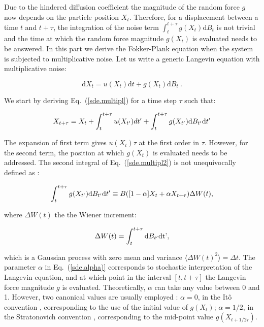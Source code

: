 Due to the hindered diffusion coefficient the magnitude of the random force $g$ now depends on the particle position $X_t$. Therefore, for a displacement between a time $t$ and $t+\tau$, the integration of the noise term $\int_t ^{t+\tau}g(X_t)\mathrm{d}B_t$ is not trivial and the time at which the random force magnitude $g(X_t)$ is evaluated needs to be answered. In this part we derive the Fokker-Plank equation when the system is subjected to multiplicative noise. Let us write a generic Langevin equation with multiplicative noise:

\begin{equation}
	\mathrm{d}X_t = u(X_t)\mathrm{d}t + g(X_t)\mathrm{d}B_t~.
	\label{sde.multipl}
\end{equation}

We start by deriving Eq.~(\ref{sde.multipl}) for a time step $\tau$ such that:

\begin{equation}
	X_{t+\tau} = X_t + \int_{t}^{t+\tau} u(X_{t'})dt' + \int_{t}^{t+\tau} g(X_{t'})\textnormal{d}B_{t'}\textnormal{d}t'
	\label{sde.multipl2}
\end{equation}

The expansion of first term gives $u(X_t)\tau$ at the first order in $\tau$. However, for the second term, the position at which $g(X_t)$ is evaluated needs to be addressed. The second integral of Eq.~{(\ref{sde.multipl2})} is not unequivocally defined as \cite{sancho_brownian_2011}:

\begin{equation}
	\int_{t}^{t+\tau}g(X_{t'})\textnormal{d}B_{t'}\textnormal{d}t' \equiv B([1 - \alpha] X_t + \alpha X_{t+\tau}) \Delta W(t),
	\label{sde.alpha}
\end{equation}

where $\Delta W (t)$ the the Wiener increment:

\begin{equation}
	\Delta W(t) = \int_{t}^{t+\tau} \textnormal{d} B_{t'} \textnormal{dt'},
\end{equation}

which is a Gaussian process with zero mean and variance $\langle \Delta W(t)^2 \rangle = \Delta t $. The parameter $\alpha$ in Eq.~{(\ref{sde.alpha)}} corresponds to stochastic interpretation of the Langevin equation, and at which point in the interval $[t, t+\tau]$ the Langevin force magnitude $g$ is evaluated. Theoretically, $\alpha$ can take any value between 0 and 1. However, two canonical values are usually employed :  $\alpha = 0$, in the Itô convention \cite{ito_stochastic_1944}, corresponding to the use of the initial value of $g(X_t)$; $\alpha = 1/2$, in the Stratonovich convention \cite{stratonovich_new_1966}, corresponding to the mid-point value $g(X_{t + 1/2\tau})$. 


